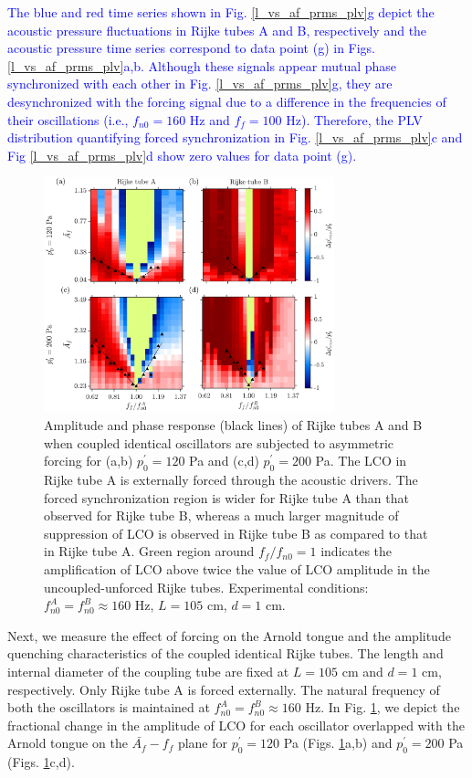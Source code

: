 \documentclass[%
preprint,
 amsmath,amssymb,
 aps,
 pra,
]{revtex4-2}
\begin{document}
\textcolor{blue}{The blue and red time series shown in Fig. \ref{l_vs_af_prms_plv}g depict the acoustic pressure fluctuations in Rijke tubes A and B, respectively and the acoustic pressure time series correspond to data point (g) in Figs. \ref{l_vs_af_prms_plv}a,b. Although these signals appear mutual phase synchronized with each other in Fig. \ref{l_vs_af_prms_plv}g, they are desynchronized with the forcing signal due to a difference in the frequencies of their oscillations (i.e., $f_{n0}= 160$ Hz and $f_f=100$ Hz). Therefore, the PLV distribution quantifying forced synchronization in Fig. \ref{l_vs_af_prms_plv}c and Fig \ref{l_vs_af_prms_plv}d show zero values for data point (g).}

\begin{figure}[t!]
\centering
\includegraphics[width=0.75\textwidth]{fig6.jpg}
\caption{\label{asymmetric_zero} Amplitude and phase response (black lines) of Rijke tubes A and B when coupled identical oscillators are subjected to asymmetric forcing for (a,b) $p^\prime_{0}=120$ Pa and (c,d) $p^\prime_{0} = 200$ Pa. The LCO in Rijke tube A is externally forced through the acoustic drivers. The forced synchronization region is wider for Rijke tube A than that observed for Rijke tube B, whereas a much larger magnitude of suppression of LCO is observed in Rijke tube B as compared to that in Rijke tube A. Green region around $f_f/f_{n0} = 1$ indicates the amplification of LCO above twice the value of LCO amplitude in the uncoupled-unforced Rijke tubes. Experimental conditions: $f^A_{n0}=f^B_{n0} \approx 160$ Hz, $L=105$ cm, $d= 1$ cm.}
\end{figure}

Next, we measure the effect of forcing on the Arnold tongue and the amplitude quenching characteristics of the coupled identical Rijke tubes. The length and internal diameter of the coupling tube are fixed at $L=105$ cm and $d=1$ cm, respectively. Only Rijke tube A is forced externally. The natural frequency of both the oscillators is maintained at $f^A_{n0}=f^B_{n0}\approx 160$ Hz. In Fig. \ref{asymmetric_zero}, we depict the fractional change in the amplitude of LCO for each oscillator overlapped with the Arnold tongue on the $\bar{A_f}-f_f$ plane for $p^\prime_{0} = 120$ Pa (Figs. \ref{asymmetric_zero}a,b) and $p^\prime_{0} = 200$ Pa (Figs. \ref{asymmetric_zero}c,d).
\end{document}
